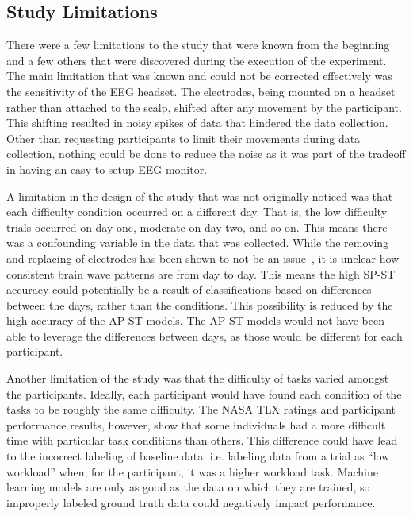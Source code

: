 \documentclass[11pt]{article}
\begin{document}
	
	\subsection{Study Limitations}
	There were a few limitations to the study that were known from the beginning and a few others that were discovered during the execution of the experiment. The main limitation that was known and could not be corrected effectively was the sensitivity of the EEG headset. The electrodes, being mounted on a headset rather than attached to the scalp, shifted after any movement by the participant. This shifting resulted in noisy spikes of data that hindered the data collection. Other than requesting participants to limit their movements during data collection, nothing could be done to reduce the noise as it was part of the tradeoff in having an easy-to-setup EEG monitor.
	
	A limitation in the design of the study that was not originally noticed was that each difficulty condition occurred on a different day. That is, the low difficulty trials occurred on day one, moderate on day two, and so on. This means there was a confounding variable in the data that was collected. While the removing and replacing of electrodes has been shown to not be an issue~\cite{Christensen}, it is unclear how consistent brain wave patterns are from day to day. This means the high SP-ST accuracy could potentially be a result of classifications based on differences between the days, rather than the conditions. This possibility is reduced by the high accuracy of the AP-ST models. The AP-ST models would not have been able to leverage the differences between days, as those would be different for each participant.
	
	Another limitation of the study was that the difficulty of tasks varied amongst the participants. Ideally, each participant would have found each condition of the tasks to be roughly the same difficulty. The NASA TLX ratings and participant performance results, however, show that some individuals had a more difficult time with particular task conditions than others. This difference could have lead to the incorrect labeling of baseline data, i.e. labeling data from a trial as ``low workload'' when, for the participant, it was a higher workload task. Machine learning models are only as good as the data on which they are trained, so improperly labeled ground truth data could negatively impact performance.
	
	
\end{document}
